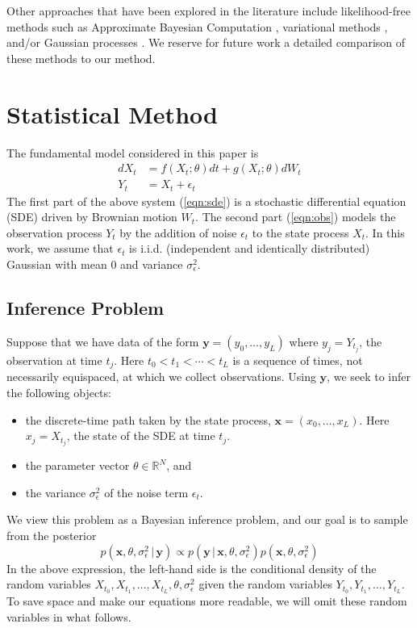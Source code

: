 \documentclass[wcp]{jmlr}
\begin{document}
Other approaches that have been explored in the literature include
likelihood-free methods such as Approximate Bayesian Computation
\citep{Picchini2014}, variational methods \citep{Archambeau2007a,
  Vrettas2015}, and/or Gaussian processes \citep{Archambeau2007,
  Ruttor2013}.  We reserve for future work a detailed comparison of these methods to
our method.

\section{Statistical Method}
\label{sect:methods}
The fundamental model considered in this paper is
\begin{subequations}
\label{eqn:sdefiltprob}
\begin{align}
\label{eqn:sde}
dX_t &= f(X_t; \theta) dt + g(X_t; \theta) dW_t \\
\label{eqn:obs}
Y_t &= X_t + \epsilon_t
\end{align}
\end{subequations}
The first part of the above system (\ref{eqn:sde}) is a stochastic differential
equation (SDE) driven by Brownian motion $W_t$.  The second part
(\ref{eqn:obs}) models the observation process $Y_t$ by the addition
of noise $\epsilon_t$ to the state process $X_t$.  In this work, we
assume that $\epsilon_t$ is i.i.d. (independent and identically
distributed) Gaussian with mean $0$ and variance $\sigma_\epsilon^2$.

\subsection{Inference Problem}
Suppose that we have data of the form $\mathbf{y} = (y_0, \ldots,
y_L)$ where $y_j = Y_{t_j}$, the observation at time $t_j$.  Here 
$t_0 < t_1 < \cdots < t_L$ is a sequence of times, not necessarily
equispaced, at which we collect observations.
Using $\mathbf{y}$, we seek to infer the following objects:
\begin{itemize}
\item the discrete-time path taken by the state process, $\mathbf{x} =
  (x_0, \ldots, x_L)$.  Here $x_j = X_{t_j}$, the state of the SDE at
  time $t_j$.
\item the parameter vector $\theta \in \mathbb{R}^N$, and 
\item the variance $\sigma_\epsilon^2$ of the noise term $\epsilon_t$.
\end{itemize}

We view this problem as a Bayesian inference problem, and our goal is
to sample from the posterior
\begin{equation}
\label{eqn:post1}
p(\mathbf{x}, \theta, \sigma_\epsilon^2 \, | \, \mathbf{y}) 
\propto p( \mathbf{y} \, | \, \mathbf{x}, \theta, \sigma_\epsilon^2 )
p(\mathbf{x}, \theta, \sigma_\epsilon^2)
\end{equation}
In the above expression, the left-hand side is the conditional density
of the random variables $X_{t_0}, X_{t_1}, \ldots, X_{t_L}, \theta,
\sigma_\epsilon^2$ given the random variables $Y_{t_0}, Y_{t_1},
  \ldots, Y_{t_L}$.  To save space and make our equations more
  readable, we will omit these random variables in what follows.
\end{document}

